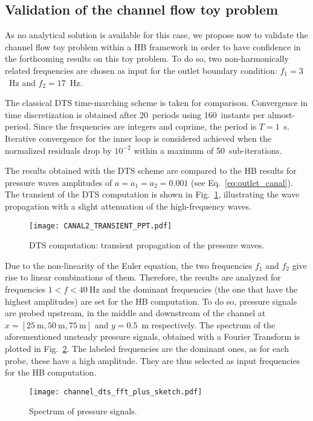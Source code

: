 \subsection{Validation of the channel flow toy problem}
\label{sec:channel_multifreq}

As no analytical solution is available for this case, we propose
now to validate the channel flow toy problem within a HB framework
in order to have confidence in the forthcoming results on this
toy problem.
To do so, two non-harmonically related
frequencies are chosen as input for the outlet boundary condition:
$f_1 = 3$~Hz and $f_2 = 17$~Hz.

The classical DTS time-marching scheme is taken for comparison.
Convergence in time discretization is obtained after 20~periods using
160~instants per almost-period. Since the frequencies are integers and
coprime, the period is $T=1$~s.  Iterative convergence for the
inner loop is considered achieved when the normalized residuals drop
by $10^{-2}$ within a maximum of 50~sub-iterations.

The results obtained with the DTS scheme are compared to the HB
results for pressure waves amplitudes of $a = a_1 = a_2 = 0.001$
(see Eq.~\eqref{eq:outlet_canal}).  The
transient of the DTS computation is shown in
Fig.~\ref{fig:canal2_transient}, illustrating the wave propagation
with a slight attenuation of the high-frequency waves.
\begin{figure}[htb]
  \centering
  \texttt{[image: CANAL2\_TRANSIENT\_PPT.pdf]}
  \caption{DTS computation: transient propagation of the pressure waves.}
  \label{fig:canal2_transient}
\end{figure}

Due to the non-linearity of the Euler equation, the two frequencies
$f_1$ and $f_2$ give rise to linear combinations of them.
Therefore, the results are analyzed for frequencies $1<f< 40~\textrm{Hz}$ and the
dominant frequencies (the one that have the highest amplitudes) are
set for the HB computation.  To do so, pressure signals are probed
upstream, in the middle and downstream of the channel at
$x=[25~\textrm{m}, 50~\textrm{m}, 75~\textrm{m}]$ and $y=0.5$~m
respectively.  The spectrum of the aforementioned unsteady pressure
signals, obtained with a Fourier Transform is plotted in
Fig.~\ref{fig:canal2_dts_fft}.  The labeled frequencies are the
dominant ones, as for each probe, these have a high amplitude. They
are thus selected as input frequencies for the HB computation.
\begin{figure}[htb]
  \centering
  \texttt{[image: channel\_dts\_fft\_plus\_sketch.pdf]}
  \caption{Spectrum of pressure signals.}
  \label{fig:canal2_dts_fft}
\end{figure}

